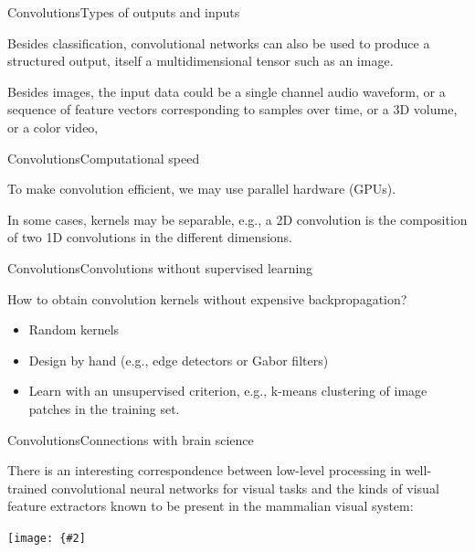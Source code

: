 \documentclass[aspectratio=169]{beamer}
\newcommand{\myfig}[3]{\centerline{\texttt{[image: \{\#2]}}}
\begin{document}
\begin{frame}{Convolutions}{Types of outputs and inputs}

  Besides classification, convolutional networks can also be used to
  produce a \alert{structured} output, itself a multidimensional
  tensor such as an image.

  \medskip
  
  Besides images, the input data could be a single channel audio
  waveform, or a sequence of feature vectors corresponding to samples
  over time, or a 3D volume, or a color video,

\end{frame}


\begin{frame}{Convolutions}{Computational speed}

  To make convolution efficient, we may use \alert{parallel hardware}
  (GPUs).

  \medskip

  In some cases, kernels may be \alert{separable}, e.g., a 2D
  convolution is the composition of two 1D convolutions in the
  different dimensions.

\end{frame}


\begin{frame}{Convolutions}{Convolutions without supervised learning}

  How to obtain convolution kernels without expensive backpropagation?
  \begin{itemize}
  \item Random kernels
  \item Design by hand (e.g., edge detectors or Gabor filters)
  \item Learn with an unsupervised criterion, e.g., k-means clustering of
   image patches in the training set.
  \end{itemize}

\end{frame}


\begin{frame}{Convolutions}{Connections with brain science}

  There is an interesting correspondence between low-level processing
  in well-trained convolutional neural networks for visual tasks and
  the kinds of visual feature extractors known to be present in the
  mammalian visual system:

  \myfig{3in}{goodfellow-fig9-19}{Goodfellow et al. (2016), Figure 9.19}

\end{frame}
\end{document}
